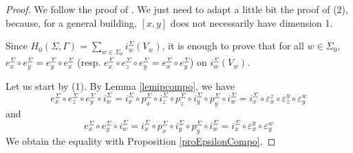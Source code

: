 \documentclass[a4paper,10pt]{amsart}
\begin{document}
\begin{proof}
	We follow the proof of \cite[Lem. 2.3.2]{Wanga}. We just need to adapt a little bit the proof of (2), because, for a general building, $[x,y]$ does not necessarily have dimension 1.



	Since $H_0(\Sigma,\Gamma)=\sum_{w \in \Sigma_0} i_w^\Sigma(V_w)$, it is enough to prove that for all $w\in \Sigma_0$, $e_x^\Sigma \circ e_y^\Sigma =e_y^\Sigma \circ e_x^\Sigma$ (resp. $e_x^\Sigma \circ e_z^\Sigma \circ e_y^\Sigma = e_x^\Sigma \circ e_y^\Sigma$) on $i_w^\Sigma(V_w)$.

	\medskip

	Let us start by (1). By Lemma \ref{lemipcompo}, we have
	\[
		e_x^\Sigma \circ e_z^\Sigma \circ e_y^\Sigma \circ i_w^\Sigma = i_x^\Sigma \circ p_x^\Sigma \circ i_z^\Sigma \circ p_z^\Sigma \circ i_y^\Sigma \circ p_y^\Sigma \circ i_w^\Sigma = i_x^\Sigma \circ \varepsilon^z_x \circ \varepsilon^y_z \circ \varepsilon^w_y
	\]
	and
	\[
		e_x^\Sigma \circ e_y^\Sigma \circ i_w^\Sigma = i_x^\Sigma \circ p_x^\Sigma \circ i_y^\Sigma \circ p_y^\Sigma \circ i_w^\Sigma = i_x^\Sigma \circ \varepsilon^y_x \circ  \varepsilon^w_y
	\]
	We obtain the equality with Proposition \ref{proEpsilonCompo}.

	\medskip


\end{proof}
\end{document}
